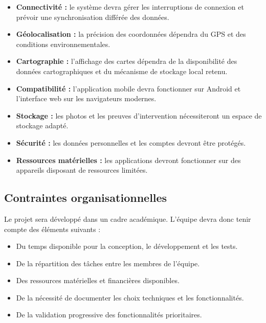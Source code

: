 \documentclass[11pt,a4paper,oneside]{report}
\begin{document}
	\begin{itemize}
		\item \textbf{Connectivité :} le système devra gérer les
		interruptions de connexion et prévoir une synchronisation
		différée des données.
		
		\item \textbf{Géolocalisation :} la précision des coordonnées
		dépendra du GPS et des conditions environnementales.
		
		\item \textbf{Cartographie :} l'affichage des cartes dépendra
		de la disponibilité des données cartographiques et du mécanisme
		de stockage local retenu.
		
		\item \textbf{Compatibilité :} l'application mobile devra
		fonctionner sur Android et l'interface web sur les navigateurs
		modernes.
		
		\item \textbf{Stockage :} les photos et les preuves d'intervention
		nécessiteront un espace de stockage adapté.
		
		\item \textbf{Sécurité :} les données personnelles et les comptes
		devront être protégés.
		
		\item \textbf{Ressources matérielles :} les applications devront
		fonctionner sur des appareils disposant de ressources limitées.
	\end{itemize}
	
	\subsection{Contraintes organisationnelles}
	
	Le projet sera développé dans un cadre académique. L'équipe devra
	donc tenir compte des éléments suivants :
	
	\begin{itemize}
		\item Du temps disponible pour la conception, le développement
		et les tests.
		\item De la répartition des tâches entre les membres de l'équipe.
		\item Des ressources matérielles et financières disponibles.
		\item De la nécessité de documenter les choix techniques et
		les fonctionnalités.
		\item De la validation progressive des fonctionnalités prioritaires.
	\end{itemize}
	
	
\end{document}
